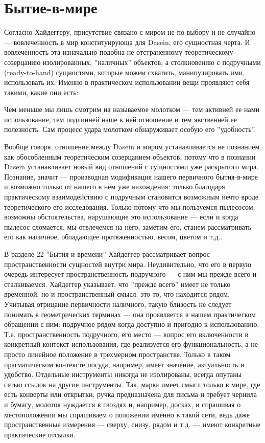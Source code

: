 \documentclass[11pt]{book}
\begin{document}
\section{Бытие-в-мире}

Согласно Хайдеггеру, присутствие связано с миром не по выбору и не случайно --- вовлеченность в мир конституирующа для Dasein, его сущностная черта. И вовлеченность эта изначально подобна не отстраненному теоретическому созерцанию изолированных, ''наличных'' объектов, а столкновению с подручными (ready-to-hand) сущностями, которые можем схватить, манипулировать ими, использовать их. Именно в практическом использовании вещи проявляют себя такими, какие они есть:

\smallskip
{}\relax
{}\relax

Чем меньше мы лишь смотрим на называемое молотком --- тем активней ее нами использование, тем подлинней наше к ней отношение и тем явственней ее полезность. Сам процесс удара молотком обнаруживает особую его ''удобность''.

\relax
{}\relax
\smallskip

Вообще говоря, отношение между Dasein и миром устанавливается не познанием как обособленным теоретическим созерцанием объектов, потому что в познании Dasein устанавливает новый вид отношений с сущностями уже раскрытого мира. Познание, значит --- производная модификация нашего первичного бытия-в-мире и возможно только от нашего в нем уже нахождения: только благодаря практическому взаимодействию с подручным становится возможным нечто вроде теоретического его исследования. Только потому что мы пользуемся пылесосом, возможны обстоятельства, нарушающие это использование --- если и когда пылесос сломается, мы отвлечемся на него, заметим его, станем рассматривать его как наличное, обладающее протяженностью, весом, цветом и т.д..

В разделе 22 ''Бытия и времени'' Хайдеггер рассматривает вопрос пространственности сущностей внутри мира. Неудивительно, что его в первую очередь интересует пространственность подручного --- с ним мы прежде всего и сталкиваемся. Хайдеггер указывает, что ''прежде всего'' имеет не только временной, но и пространственный смысл: это то, что находится рядом. Учитывая отрицание первичности наличного, такую близость не следует понимать в геометрических терминах --- она проявляется в нашем практическом обращении с ним: подручное рядом когда доступно и пригодно к использованию. Т.е. пространственность подручного, его место --- вопрос его включенности в конкретный контекст использования, где реализуется его функциональность, а не просто линейное положение в трехмерном пространстве. Только в таком прагматическом контексте посуда, например, имеет значение, актуальность и удобство. Отдельные инструменты никогда не изолированы, всегда опутаны сетью ссылок на другие инструменты. Так, марка имеет смысл только в мире, где есть конверты или открытки, ручка предназначена для письма и требует чернила и бумагу, молоток нуждается в гвоздях и, например, досках, и спрашивая о местоположении мы спрашиваем о положении именно в такой сети, ведь даже пространственные измерения --- сверху, снизу, рядом и т.д. --- имеют конкретные практические отсылки.
\end{document}
